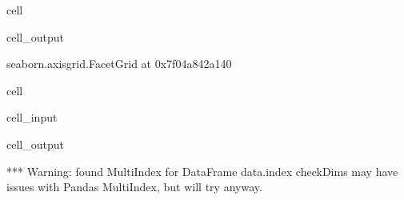\documentclass[letterpaper,table,10pt,english]{jupyterBook}
\begin{document}
\begin{sphinxuseclass}{cell}
\begin{sphinxVerbatimOutput}
\begin{sphinxuseclass}{cell_output}
\begin{sphinxVerbatim}[commandchars=\\\{\}]
\PYGZlt{}seaborn.axisgrid.FacetGrid at 0x7f04a842a140\PYGZgt{}
\end{sphinxVerbatim}

\noindent{}

\end{sphinxuseclass}\end{sphinxVerbatimOutput}

\end{sphinxuseclass}
\begin{sphinxuseclass}{cell}\begin{sphinxVerbatimInput}

\begin{sphinxuseclass}{cell_input}
\begin{sphinxVerbatim}[commandchars=\\\{\}]
   
       
                      
\end{sphinxVerbatim}

\end{sphinxuseclass}\end{sphinxVerbatimInput}
\begin{sphinxVerbatimOutput}

\begin{sphinxuseclass}{cell_output}
\begin{sphinxVerbatim}[commandchars=\\\{\}]
*** Warning: found MultiIndex for DataFrame data.index \PYGZhy{} checkDims may have issues with Pandas MultiIndex, but will try anyway.
\end{sphinxVerbatim}


\end{sphinxuseclass}
\end{sphinxVerbatimOutput}
\end{sphinxuseclass}
\end{document}
